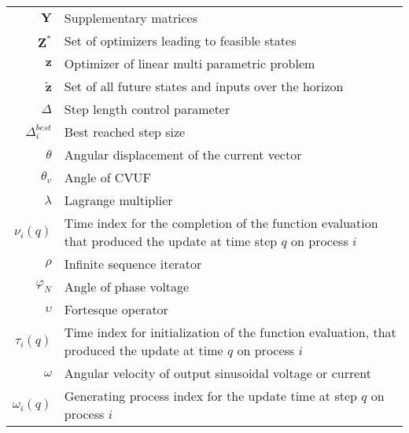 \begin{scriptsize}
\begin{tabularx}{\textwidth}{r|X}
 $\textbf{Y}$ & Supplementary matrices\\

$\textbf{Z}^*$              & Set of optimizers leading to feasible states\\
$\textbf{z}$											& Optimizer of linear multi parametric problem\\
$\tilde{\textbf{z}}$        & Set of all future states and inputs over the horizon\\

$\Delta$													& Step length control parameter\\
$\Delta_i^{best}$											& Best reached step size\\
$\theta$                    & Angular displacement of the current vector\\
$\theta_v$  											& Angle of CVUF\\
$\lambda$                   & Lagrange multiplier\\
$\nu_i(q)$ 												& Time index for the completion of the function evaluation that produced the update at time step $q$ on process $i$\\
$\rho$																& Infinite sequence iterator\\
$\varphi_N$												& Angle of phase voltage\\
$\upsilon$  											& Fortesque operator\\
$\tau_i(q)$												& Time index for initialization of the function evaluation, that produced the update at time $q$ on process $i$\\
$\omega$													& Angular velocity of output sinusoidal voltage or current\\
$\omega_i(q)$ 										& Generating process index for the update time at step $q$ on process $i$\\

\end{tabularx}
\end{scriptsize}

